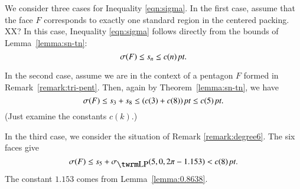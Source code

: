 

We consider three cases for Inequality \ref{eqn:sigma}. In the
first case, assume that the face $F$ corresponds to exactly one
standard region in the centered packing.  XX? In this case,
Inequality \ref{eqn:sigma} follows directly from the bounds of
Lemma~\ref{lemma:sn-tn}:
    $$\sigma(F)\le s_n \le c(n)\,\hbox{\it pt}.$$

In the second case, assume we are in the context of a pentagon $F$
formed in Remark~\ref{remark:tri-pent}.  Then, again by
Theorem~\ref{lemma:sn-tn}, we have
$$\sigma(F) \le s_3+s_8\le (c(3)+c(8))\,\hbox{\it pt} \le c(5)\,\hbox{\it pt}.$$
(Just examine the constants $c(k)$.)

In the third case, we consider the situation of Remark
\ref{remark:degree6}.  The six faces give
$$\sigma(F)\le s_5+\sLP(5,0,2\pi-1.153)< c(8)\,\pt.$$
The constant $1.153$ comes from Lemma~\ref{lemma:0.8638}.


